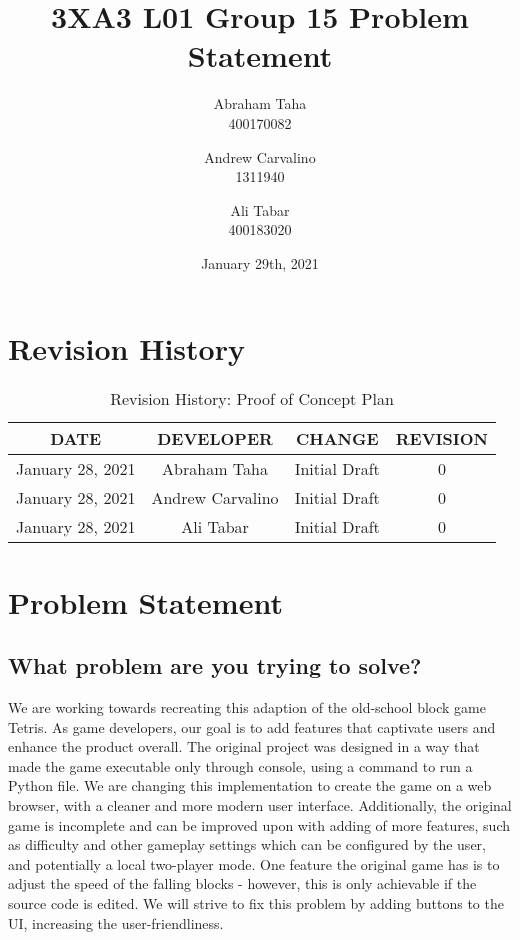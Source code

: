 \documentclass[11pt, oneside]{article}   	%
\title{3XA3 L01 Group 15 Problem Statement
}
\author{Abraham Taha\\
		400170082
		\and
		Andrew Carvalino\\
		1311940
		\and
		Ali Tabar\\
		400183020}
\date{January 29th, 2021}							%
\begin{document}
\maketitle
\newpage
\tableofcontents
\newpage

\section{Revision History}

\begin{table}[hp]
\caption{Revision History: Proof of Concept Plan}
\begin{center}
\label{tab:}
\begin{tabular}{|c|c|c|c|}
\hline
\textbf{DATE} & \textbf{DEVELOPER} & \textbf{CHANGE} & \textbf{REVISION}\\
\hline
January 28, 2021 & Abraham Taha & Initial Draft & 0\\
\hline
January 28, 2021 & Andrew Carvalino & Initial Draft & 0\\
\hline
January 28, 2021 & Ali Tabar & Initial Draft & 0\\
\hline
\end{tabular}
\end{center}
\label{default}
\end{table}


\newpage
\section{Problem Statement}
\subsection{What problem are you trying to solve?}

\newcommand*\apos{\textsc{\char13}}
We are working towards recreating this adaption of the old-school block game Tetris. As game developers, our goal is to add features that captivate users and enhance the product overall. The original project was designed in a way that made the game executable only through console, using a command to run a Python file. We are changing this implementation to create the game on a web browser, with a cleaner and more modern user interface. Additionally, the original game is incomplete and can be improved upon with adding of more features, such as difficulty and other gameplay settings which can be configured by the user, and potentially a local two-player mode. One feature the original game has is to adjust the speed of the falling blocks - however, this is only achievable if the source code is edited. We will strive to fix this problem by adding buttons to the UI, increasing the user-friendliness.
\end{document}
